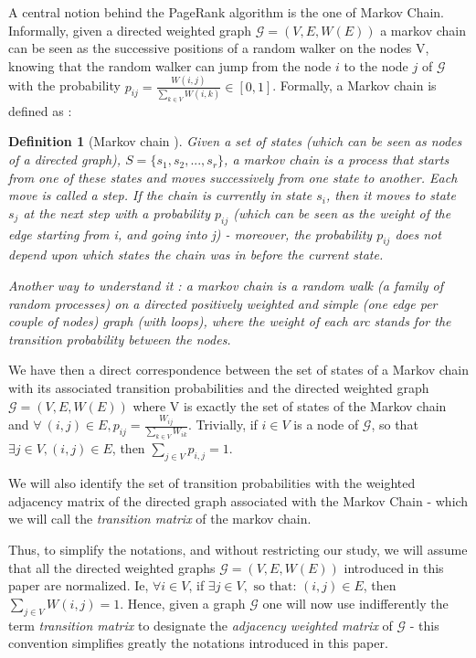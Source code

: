 \documentclass[sn-mathphys]{sn-jnl}%
\theoremstyle{thmstyleone}%
\theoremstyle{thmstyletwo}%
\theoremstyle{thmstylethree}%
\newtheorem{definition}[theo]{Definition}
\begin{document}
A central notion behind the PageRank algorithm is the one of Markov
Chain. Informally, given a directed weighted graph
$\mathcal{G} = (V,E, W(E))$ a markov chain can be seen as the
successive positions of a random walker on the nodes V, knowing that
the random walker can jump from the node $i$ to the node $j$ of
$\mathcal{G}$ with the probability
$p_{ij} = \frac{W(i,j)}{\sum_{k\in V} W(i,k)} \in [0,1]$. Formally, a
Markov chain is defined as :

\begin{definition}[Markov chain \cite{grinstead_snell_2006}]

  Given a set of \textit{states} (which can be seen as nodes of a
  directed graph), $S=\{s_1, s_2, ..., s_r\}$, a markov chain is a
  process that starts from one of these states and moves successively
  from one state to another. Each move is called a \textit{step}. If
  the chain is currently in state $s_i$, then it moves to state $s_j$
  at the next step with a probability $p_{ij}$ (which can be seen as
  the weight of the edge starting from i, and going into j) -
  moreover, the probability $p_{ij}$ does not depend upon which states
  the chain was in before the current state.

  Another way to understand it : a markov chain is a random walk (a
  family of random processes) on a directed positively weighted and
  simple (one edge per couple of nodes) graph (with loops), where the
  weight of each arc stands for the transition probability between the
  nodes.

\end{definition}

We have then a direct correspondence between the set of states of a
Markov chain with its associated transition probabilities and the
directed weighted graph $\mathcal{G}=(V, E, W(E))$ where V is exactly
the set of states of the Markov chain and
$\forall \ (i,j) \in E, p_{ij} = \frac{W_{ij}}{\sum_{k\in V} W_{ik}}$.
Trivially, if $i \in V$ is a node of $\mathcal{G}$, so that
$\exists j \in V, (i,j) \in E$, then $\sum_{j \in V} p_{i,j} = 1$.

We will also identify the set of transition probabilities with the
weighted adjacency matrix of the directed graph associated with the
Markov Chain - which we will call the \textit{transition matrix} of
the markov chain.

Thus, to simplify the notations, and without restricting our study, we
will assume that all the directed weighted graphs
$\mathcal{G}=(V, E, W(E))$ introduced in this paper are
normalized. Ie, $\forall i \in V$, if
$\exists j \in V, \mbox{ so that: } (i,j)\in E$, then
$\sum_{j \in V} W(i,j) = 1$. Hence, given a graph $\mathcal{G}$ one
will now use indifferently the term \textit{transition matrix} to
designate the \textit{adjacency weighted matrix} of $\mathcal{G}$ -
this convention simplifies greatly the notations introduced in this
paper.
\end{document}
